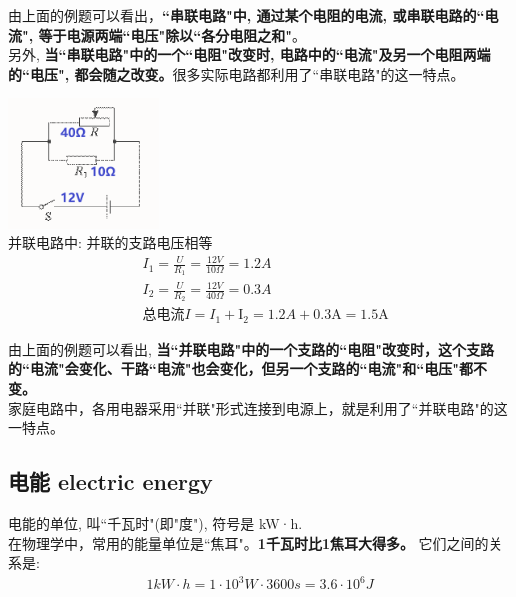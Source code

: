 \documentclass[UTF8]{ctexart}
\begin{document}
	由上面的例题可以看出，\textbf{``串联电路"中, 通过某个电阻的电流, 或串联电路的``电流", 等于电源两端``电压"除以``各分电阻之和"}。 \\
	另外, \textbf{当``串联电路"中的一个``电阻"改变时, 电路中的``电流"及另一个电阻两端的``电压", 都会随之改变。}很多实际电路都利用了``串联电路"的这一特点。\\
	
	
	
	\begin{tcolorbox}[title = {例},boxrule={0.1em},colframe={black!10}, colback={black!3},colbacktitle={black!10},coltitle={black}]		
		\includegraphics[width=0.3\textwidth]{img/0058.png} \\	
	并联电路中: 并联的支路电压相等
	\begin{align*}
			& I_1=\frac{U}{R_1}=\frac{12V}{10\varOmega}=1.2A\\
		& I_2=\frac{U}{R_2}=\frac{12V}{40\varOmega}=0.3A\\
		& \text{总电流}I=I_1+\text{I}_2=1.2A+0.3\text{A}=1.5\text{A}		
	\end{align*}	
	\end{tcolorbox}
	
	由上面的例题可以看出, \textbf{当``并联电路"中的一个支路的``电阻"改变时，这个支路的``电流"会变化、干路``电流"也会变化，但另一个支路的``电流"和``电压"都不变。} \\
	家庭电路中，各用电器采用``并联"形式连接到电源上，就是利用了``并联电路"的这一特点。\\
	
\vspace{1em} 


\subsection{电能 electric energy}

电能的单位, 叫``千瓦时"(即"度"), 符号是 kW·h.  \\
在物理学中，常用的能量单位是``焦耳"。\textbf{1千瓦时比1焦耳大得多。} 它们之间的关系是: 
\begin{align*}
	\boxed{
	1 kW·h = 1 \cdot 10^3 W \cdot 3600s = 3.6 \cdot 10^6 J	
	}
\end{align*}
\end{document}

